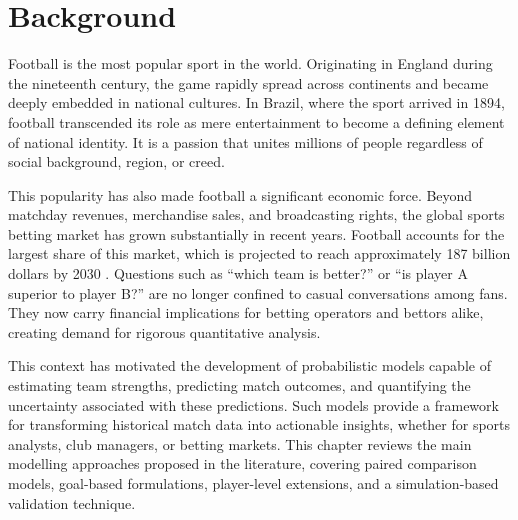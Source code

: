 \chapter{Background}
\label{background}

Football is the most popular sport in the world.
Originating in England during the nineteenth century, the game rapidly spread across continents and became deeply embedded in national cultures.
In Brazil, where the sport arrived in 1894, football transcended its role as mere entertainment to become a defining element of national identity.
It is a passion that unites millions of people regardless of social background, region, or creed.

This popularity has also made football a significant economic force.
Beyond matchday revenues, merchandise sales, and broadcasting rights, the global sports betting market has grown substantially in recent years.
Football accounts for the largest share of this market, which is projected to reach approximately 187 billion dollars by 2030 \cite{gvr_2024}.
Questions such as ``which team is better?'' or ``is player A superior to player B?'' are no longer confined to casual conversations among fans.
They now carry financial implications for betting operators and bettors alike, creating demand for rigorous quantitative analysis.

This context has motivated the development of probabilistic models capable of estimating team strengths, predicting match outcomes, and quantifying the uncertainty associated with these predictions.
Such models provide a framework for transforming historical match data into actionable insights, whether for sports analysts, club managers, or betting markets.
This chapter reviews the main modelling approaches proposed in the literature, covering paired comparison models, goal-based formulations, player-level extensions, and a simulation-based validation technique.

